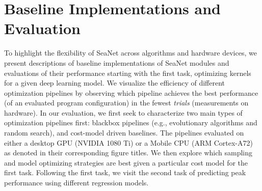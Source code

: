 
\section{Baseline Implementations and Evaluation}
To highlight the flexibility of SeaNet across algorithms and hardware devices, we present descriptions of baseline implementations of SeaNet modules and evaluations of their performance starting with the first task, optimizing kernels for a given deep learning model.
We visualize the efficiency of different optimization pipelines by observing which pipeline achieves the best performance (of an evaluated program configuration) in the fewest \emph{trials} (measurements on hardware).
In our evaluation, we first seek to characterize two main types of optimization pipelines first: blackbox pipelines (e.g., evolutionary algorithms and random search), and cost-model driven baselines.
The pipelines evaluated on either a desktop GPU (NVIDIA 1080 Ti) or a Mobile CPU (ARM Cortex-A72) as denoted in their corresponding figure titles.
We then explore which sampling and model optimizing strategies are best given a particular cost model for the first task.
Following the first task, we visit the second task of predicting peak performance using different regression models.
